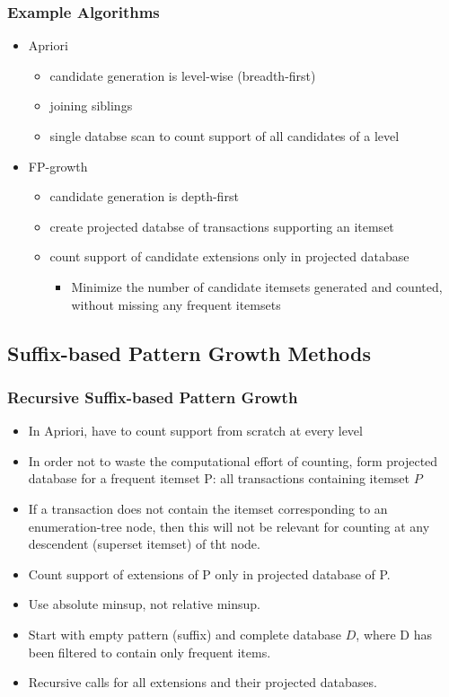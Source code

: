 \documentclass{article}
\begin{document}
\subsubsection{Example Algorithms}
\begin{itemize}
  \item Apriori
    \begin{itemize}
    \item candidate generation is level-wise (breadth-first)
    \item joining siblings
    \item single databse scan to count support of all candidates of a level
    \end{itemize}
  \item FP-growth
    \begin{itemize}
    \item candidate generation is depth-first
    \item create projected databse of transactions supporting an itemset
    \item count support of candidate extensions only in projected database
      \begin{itemize}
        \item Minimize the number of candidate itemsets generated and counted, without missing any frequent itemsets
      \end{itemize}
    \end{itemize}
\end{itemize}

\subsection{Suffix-based Pattern Growth Methods}
\subsubsection{Recursive Suffix-based Pattern Growth}
\begin{itemize}
\item In Apriori, have to count support from scratch at every level
\item In order not to waste the computational effort of counting, form projected database for a frequent itemset P: all transactions containing itemset $P$
\item If a transaction does not contain the itemset corresponding to an enumeration-tree node, then this will not be relevant for counting at any descendent (superset itemset) of tht node.
\item Count support of extensions of P only in projected database of P.
\item Use absolute minsup, not relative minsup.
\item Start with empty pattern (suffix) and complete database $D$, where D has been filtered to contain only frequent items.
\item Recursive calls for all extensions and their projected databases.
\end{itemize}
\end{document}
